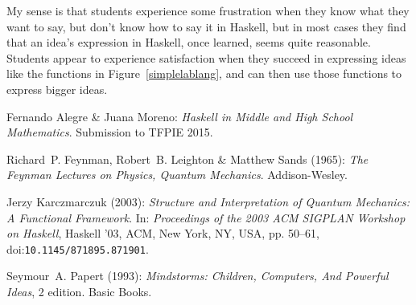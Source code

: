 \documentclass[12pt]{article}
\begin{document}
My sense is that students experience some frustration
when they know what they want to say, but don't know how to say it
in Haskell, but in most cases they find that an idea's expression
in Haskell, once learned, seems quite reasonable.  Students appear
to experience
satisfaction when they succeed in expressing ideas like the functions in
Figure~\ref{simplelablang}, and can then use those functions
to express bigger ideas.

\begin{thebibliography}{10}
\providecommand{\bibitemdeclare}[2]{}
\providecommand{\surnamestart}{}
\providecommand{\surnameend}{}
\providecommand{\urlprefix}{Available at }
\providecommand{\url}[1]{\texttt{#1}}
\providecommand{\href}[2]{\texttt{#2}}
\providecommand{\urlalt}[2]{\href{#1}{#2}}
\providecommand{\doi}[1]{doi:\urlalt{http://dx.doi.org/#1}{#1}}
\providecommand{\bibinfo}[2]{#2}

\bibitemdeclare{unpublished}{alegreTFPIE2015}
\bibinfo{author}{Fernando \surnamestart Alegre\surnameend} \&
  \bibinfo{author}{Juana \surnamestart Moreno\surnameend}:
  \emph{\bibinfo{title}{Haskell in Middle and High School Mathematics}}.
\newblock \bibinfo{note}{Submission to TFPIE 2015}.

\bibitemdeclare{book}{feynmanlectures3}
\bibinfo{author}{Richard~P. \surnamestart Feynman\surnameend},
  \bibinfo{author}{Robert~B. \surnamestart Leighton\surnameend} \&
  \bibinfo{author}{Matthew \surnamestart Sands\surnameend}
  (\bibinfo{year}{1965}): \emph{\bibinfo{title}{The Feynman Lectures on
  Physics, Quantum Mechanics}}.
\newblock \bibinfo{publisher}{Addison-Wesley}.

\bibitemdeclare{inproceedings}{karczmarczuk2003}
\bibinfo{author}{Jerzy \surnamestart Karczmarczuk\surnameend}
  (\bibinfo{year}{2003}): \emph{\bibinfo{title}{Structure and Interpretation of
  Quantum Mechanics: A Functional Framework}}.
\newblock In: {\sl \bibinfo{booktitle}{Proceedings of the 2003 ACM SIGPLAN
  Workshop on Haskell}}, \bibinfo{series}{Haskell '03},
  \bibinfo{publisher}{ACM}, \bibinfo{address}{New York, NY, USA}, pp.
  \bibinfo{pages}{50--61}, \doi{10.1145/871895.871901}.

\bibitemdeclare{book}{papert}
\bibinfo{author}{Seymour~A. \surnamestart Papert\surnameend}
  (\bibinfo{year}{1993}): \emph{\bibinfo{title}{Mindstorms: Children,
  Computers, And Powerful Ideas}}, \bibinfo{edition}{2} edition.
\newblock \bibinfo{publisher}{Basic Books}.


\end{thebibliography}
\end{document}

